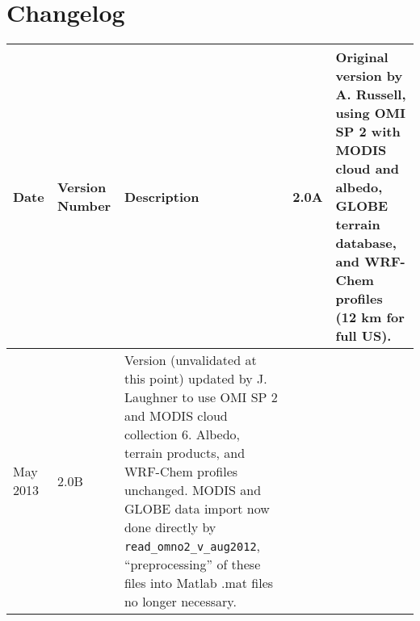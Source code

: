 \documentclass[12pt]{article}
\begin{document}
\section{Changelog}
\bgroup
\def\arraystretch{1.5}
	\begin{table}[h]
		\begin{longtabu} to \textwidth{| l | l | X |} \hline
			Date 		& 	Version Number		&	Description \endhead {}		&	2.0A				&	Original version by A. Russell, using OMI SP 2 with MODIS cloud and albedo, GLOBE terrain database, and WRF-Chem profiles (12 km for full US). \\ \hline
			May 2013	&	2.0B				&	Version (unvalidated at this point) updated by J. Laughner to use OMI SP 2 and MODIS cloud collection 6.  Albedo, terrain products, and WRF-Chem profiles unchanged.  MODIS and GLOBE data import now done directly by {\lstinline[breaklines=true]|read_omno2_v_aug2012|}, ``preprocessing'' of these files into Matlab .mat files no longer necessary. \\ \hline
		\end{longtabu}
	\end{table}
\egroup
\end{document}
